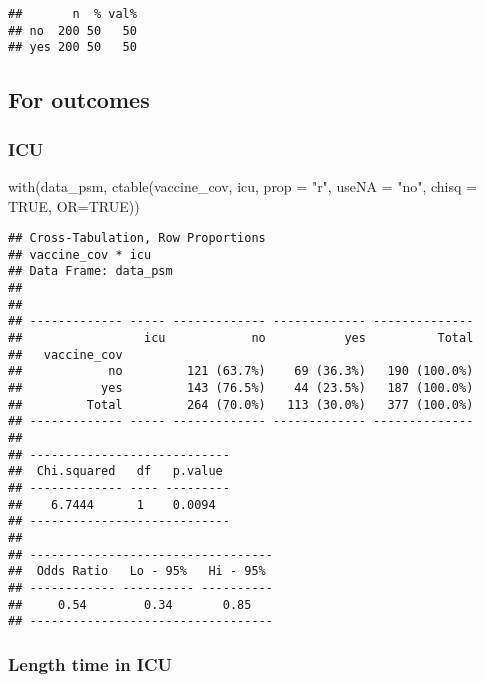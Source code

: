 \documentclass[
]{article}
\newenvironment{Shaded}{\begin{snugshade}}{\end{snugshade}}
\newcommand{\AttributeTok}[1]{\textcolor[rgb]{0.77,0.63,0.00}{#1}}
\newcommand{\ConstantTok}[1]{\textcolor[rgb]{0.00,0.00,0.00}{#1}}
\newcommand{\FunctionTok}[1]{\textcolor[rgb]{0.00,0.00,0.00}{#1}}
\newcommand{\NormalTok}[1]{#1}
\newcommand{\StringTok}[1]{\textcolor[rgb]{0.31,0.60,0.02}{#1}}
\begin{document}
\begin{verbatim}
##       n  % val%
## no  200 50   50
## yes 200 50   50
\end{verbatim}

\hypertarget{for-outcomes}{%
\subsection{For outcomes}\label{for-outcomes}}

\hypertarget{icu-1}{%
\subsubsection{ICU}\label{icu-1}}

\begin{Shaded}
\begin{Highlighting}[]
\FunctionTok{with}\NormalTok{(data\_psm, }\FunctionTok{ctable}\NormalTok{(vaccine\_cov, icu, }\AttributeTok{prop =} \StringTok{"r"}\NormalTok{, }\AttributeTok{useNA =} \StringTok{"no"}\NormalTok{, }\AttributeTok{chisq =} \ConstantTok{TRUE}\NormalTok{, }\AttributeTok{OR=}\ConstantTok{TRUE}\NormalTok{))}
\end{Highlighting}
\end{Shaded}

\begin{verbatim}
## Cross-Tabulation, Row Proportions  
## vaccine_cov * icu  
## Data Frame: data_psm  
## 
## 
## ------------- ----- ------------- ------------- --------------
##                 icu            no           yes          Total
##   vaccine_cov                                                 
##            no         121 (63.7%)    69 (36.3%)   190 (100.0%)
##           yes         143 (76.5%)    44 (23.5%)   187 (100.0%)
##         Total         264 (70.0%)   113 (30.0%)   377 (100.0%)
## ------------- ----- ------------- ------------- --------------
## 
## ----------------------------
##  Chi.squared   df   p.value 
## ------------- ---- ---------
##    6.7444      1    0.0094  
## ----------------------------
## 
## ----------------------------------
##  Odds Ratio   Lo - 95%   Hi - 95% 
## ------------ ---------- ----------
##     0.54        0.34       0.85   
## ----------------------------------
\end{verbatim}

\hypertarget{length-time-in-icu-1}{%
\subsubsection{Length time in ICU}\label{length-time-in-icu-1}}
\end{document}
